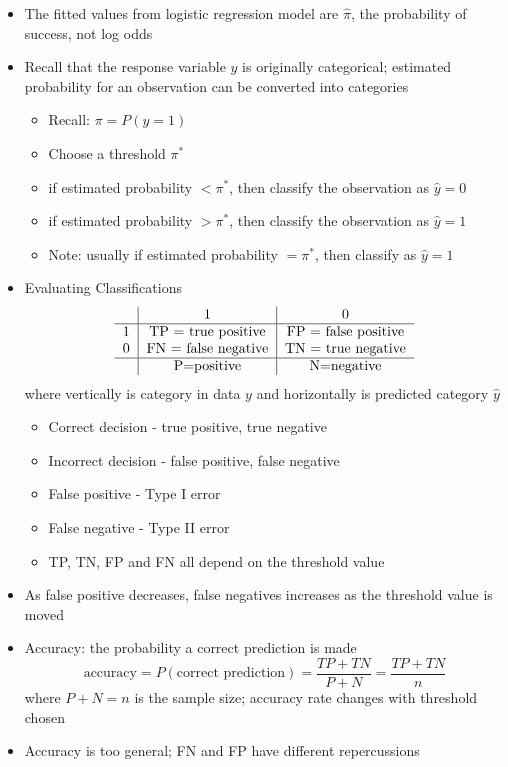\documentclass[12pt]{article}
\begin{document}
\begin{itemize}
\item The fitted values from logistic regression model are $\hat{\pi}$, the probability of success, not log odds
\item Recall that the response variable $y$ is originally categorical; estimated probability for an observation can be converted into categories \begin{itemize} 
\item Recall: $\pi = P(y=1)$
\item Choose a threshold $\pi^*$ 
\item if estimated probability $< \pi^*$, then classify the observation as $\hat{y} = 0$ 
\item if estimated probability $> \pi^*$, then classify the observation as $\hat{y}  =1$ 
\item Note: usually if estimated probability $= \pi^*$, then classify as $\hat{y} = 1$ \end{itemize} 
\item Evaluating Classifications $$ \begin{tabular}{c|c|c} & 1 & 0 \\ \hline 1 & TP = true positive & FP = false positive \\ 0 & FN = false negative & TN = true negative \\ \hline & P=positive & N=negative  \end{tabular} $$ where vertically is category in data $y$ and horizontally is predicted category $\hat{y}$ \begin{itemize}
\item Correct decision - true positive, true negative 
\item Incorrect decision - false positive, false negative 
\item False positive - Type I error 
\item False negative - Type II error 
\item TP, TN, FP and FN all depend on the threshold value \end{itemize} 
\item As false positive decreases, false negatives increases as the threshold value is moved 
\item Accuracy: the probability a correct prediction is made $$ \text{accuracy} = P(\text{correct prediction}) = \frac{TP + TN}{P+N} = \frac{TP + TN}{n} $$ where $P+N=n$ is the sample size; accuracy rate changes with threshold chosen
\item Accuracy is too general; FN and FP have different repercussions 

\end{itemize}
\end{document}

